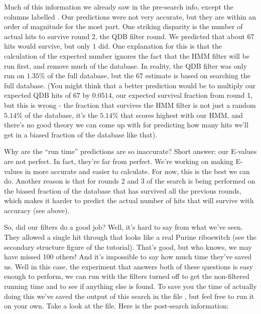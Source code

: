 Much of this information we already saw in the pre-search info, except
the columns labelled . Our predictions were not very
accurate, but they are within an order of magnitude for the most
part. One striking disparity is the number of actual hits to survive
round 2, the QDB filter round. We predicted that about $67$ hits
would survive, but only $1$ did. One explanation for this is
that the calculation of the expected number ignores the fact that the
HMM filter will be run first, and remove much of the database. In
reality, the QDB filter was only run on $1.35\%$ of the full
database, but the $67$ estimate is based on searching the full
database. (You might think that a better prediction would be to 
multiply our expected QDB hits of $67$ by $0.0514$, our expected
survival fraction from round 1, but this is wrong - the fraction that
survives the HMM filter is not just a random $5.14\%$ of the database,
it's the $5.14\%$ that scores highest with our HMM, and there's no good
theory we can come up with for predicting how many hits we'll get in a
biased fraction of the database like that).

\begin{srefaq}{Why are the  ``run time'' predictions are
  so inaccurate?} Short answer: our E-values are not perfect. In fact,
  they're far from perfect. We're working on making E-values in
   more accurate and easier to calculate. For now,
  this is the best we can do. Another reason is that for rounds 2 and
  3 of  the search is being performed on the biased
  fraction of the database that has survived all the previous rounds,
  which makes it harder to predict the actual number of hits that will
  survive with accuracy (see above).
\end{srefaq}

So, did our filters do a good job? Well, it's hard to say from what
we've seen. They allowed a single hit through that looks like a real
Purine riboswitch (see the secondary structure figure of the
tutorial). That's good, but who knows, we may have missed 100 others!
And it's impossible to say how much time they've saved us. Well in
this case, the experiment that answers both of these questions is easy
enough to perform, we can run  with the filters turned
off to get the non-filtered running time and to see if anything else
is found. To save you the time of actually doing this we've saved the
output of this search in the file ,
but feel free to run it on your own. Take a look at the file. Here is
the post-search information:

